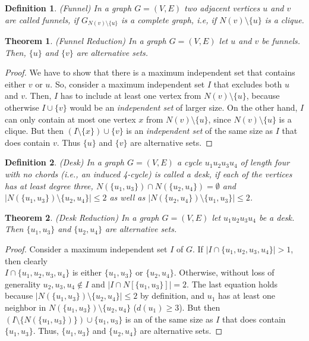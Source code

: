 \documentclass[12pt,a4paper,twoside]{scrartcl}
\newtheorem{theorem}{Theorem}
\newtheorem{definition}{Definition}
\numberwithin{equation}{section}
\begin{document}
\begin{definition} (Funnel)
	In a graph $G=(V,E)$ two adjacent vertices $u$ and $v$ are called funnels, if $G_{N(v)\setminus\{u\}}$ is a complete graph, i.e, if $N(v)\setminus\{u\}$ is a clique.
\end{definition}
\begin{theorem} (Funnel Reduction) In a graph $G=(V,E)$ let $u$ and $v$ be funnels. Then, $\{u\}$ and $\{v\}$ are alternative sets.	
\end{theorem}
\begin{proof}
	We have to show that there is a maximum independent set that contains either $v$ or $u$. So, consider a maximum independent set $I$ that excludes both $u$ and $v$. Then, $I$ has to include at least one vertex from $N(v)\setminus\{u\}$, because otherwise $I\cup\{v\}$ would be an \textit{independent set} of larger size. On the other hand, $I$ can only contain at most one vertex $x$ from $N(v)\setminus\{u\}$, since $N(v)\setminus\{u\}$ is a clique. But then $(I\setminus\{x\})\cup\{v\}$ is an \textit{independent set} of the same size as $I$ that does contain $v$. Thus $\{u\}$ and $\{v\}$ are alternative sets.
\end{proof}

\begin{definition} (Desk)
	In a graph $G=(V,E)$ a cycle $u_1u_2u_3u_4$ of length four with no chords (i.e., an induced 4-cycle) is called a desk, if each of the vertices has at least degree three, $N(\{u_1, u_3\})\cap N(\{u_2, u_4\}) = \emptyset$ and $|N(\{u_1, u_3\})\setminus \{u_2, u_4\}|\leq 2$ as well as $|N(\{u_2, u_4\})\setminus \{u_1, u_3\}|\leq 2$.
\end{definition}
\begin{theorem}(Desk Reduction) 
	In a graph $G=(V,E)$ let $u_1u_2u_3u_4$ be a desk. Then $\{u_1, u_3\}$ and $\{u_2, u_4\}$ are alternative sets.	
\end{theorem}
\begin{proof}
	Consider a maximum independent set $I$ of $G$. If $|I\cap \{u_1,u_2,u_3,u_4\}| > 1$, then clearly\\ $I\cap \{u_1,u_2,u_3,u_4\} $ is either $\{u_1, u_3\}$ or $\{u_2, u_4\}$. Otherwise, without loss of generality $u_2,u_3,u_4\notin I$ and $|I\cap N[\{u_1,u_3\}]|=2$. The last equation holds because $|N(\{u_1, u_3\})\setminus\{u_2,u_4\}| \leq 2$ by definition, and $u_1$ has at least one neighbor in $N(\{u_1, u_3\})\setminus\{u_2,u_4\}$ ($d(u_1)\geq3$). But then $(I\setminus\{N(\{u_1,u_3\})\})\cup\{u_1,u_3\}$ is an  of the same size as $I$ that does contain $\{u_1, u_3\}$. Thus, $\{u_1,u_3\}$ and $\{u_2, u_4\}$ are alternative sets.
\end{proof}
\end{document}
